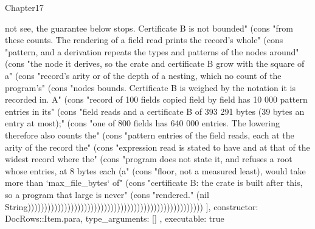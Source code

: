 \begin{lexlean}{Chapter17}
\begin{semanticmodule}
{{not see, the guarantee below stops. Certificate B is not bounded" (cons "from these counts. The rendering of a field read prints the record's whole" (cons "pattern, and a derivation repeats the types and patterns of the nodes around" (cons "the node it derives, so the crate and certificate B grow with the square of a" (cons "record's arity or of the depth of a nesting, which no count of the program's" (cons "nodes bounds. Certificate B is weighed by the notation it is recorded in. A" (cons "record of 100 fields copied field by field has 10 000 pattern entries in its" (cons "field reads and a certificate B of 393 291 bytes (39 bytes an entry at most);" (cons "one of 800 fields has 640 000 entries. The lowering therefore also counts the" (cons "pattern entries of the field reads, each at the arity of the record the" (cons "expression read is stated to have and at that of the widest record where the" (cons "program does not state it, and refuses a root whose entries, at 8 bytes each (a" (cons "floor, not a measured least), would take more than `max_file_bytes` of" (cons "certificate B: the crate is built after this, so a program that large is never" (cons "rendered." (nil String)))))))))))))))))))))))))))))))))))))))))))))))))))))
    ],
    constructor: DocRows::Item.para,
    type_arguments: []
  },
  executable: true
}


\end{semanticmodule}
\end{lexlean}
